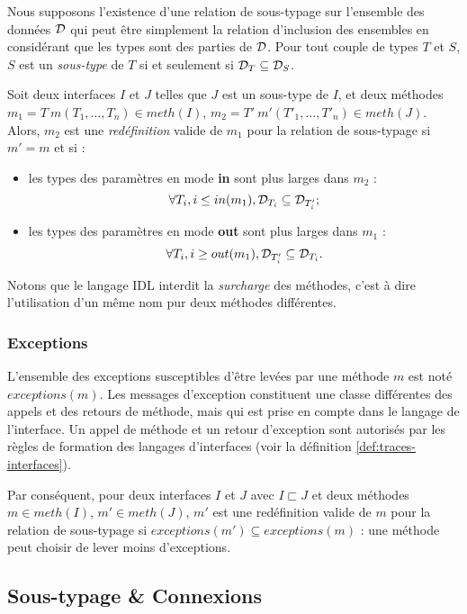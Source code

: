 Nous supposons l'existence d'une relation de sous-typage sur
l'ensemble des donn\'ees ${\cal D}$ qui peut \^etre simplement la
relation d'inclusion des ensembles en consid\'erant que les types
sont des parties de ${\cal D}$. Pour tout couple de  types $T$ et $S$, $S$ est un
\emph{sous-type} de $T$ si et seulement si ${\cal D}_T\subseteq {\cal D}_S$. 

Soit deux interfaces $I$ et $J$ telles que $J$ est un sous-type de
$I$, et deux m\'ethodes $m_1=T\ m(T_1,\dots,
T_n) \in meth(I)$, $m_2=T'\ m'(T'_1,\dots, T'_n) \in
meth(J)$. Alors, $m_2$ est une
\emph{red\'efinition} valide de $m_1$ pour  la relation de
sous-typage si $m'=m$ et si :
\begin{itemize}
  \item les types des param\`etres en mode \textbf{in} sont plus
  \og larges \fg{} dans $m_2$ : 
$$
\forall T_i, i\leq in(m_1), {\cal D}_{T_i} \subseteq {\cal D}_{T'_i} ;
$$
\item les types des param\`etres en mode \textbf{out} sont plus
  \og larges \fg{} dans $m_1$ : 
$$
\forall T_i, i\geq out(m_1), {\cal D}_{T'_i} \subseteq {\cal D}_{T_i}.
$$

\end{itemize}
Notons que le langage \textsf{IDL} interdit la \emph{surcharge} des
m\'ethodes, c'est \`a dire l'utilisation d'un m\^eme nom pur deux
m\'ethodes diff\'erentes.

\subsubsection{Exceptions}

L'ensemble des exceptions susceptibles d'\^etre lev\'ees par une
m\'ethode $m$ est not\'e $exceptions(m)$. Les messages d'exception
constituent une classe diff\'erentes des appels et des retours de
m\'ethode, mais qui est prise en compte dans le langage de
l'interface. Un appel de m\'ethode et un retour d'exception sont
autoris\'es par les r\`egles de formation des langages d'interfaces
(voir la d\'efinition \ref{def:traces-interfaces}). 

Par cons\'equent, pour deux interfaces $I$ et $J$ avec $I\sqsubset J$
et deux m\'ethodes $m \in meth(I)$, $m'\in meth(J)$, $m'$ est une
red\'efinition valide de $m$ pour la relation de sous-typage si
$exceptions(m') \subseteq exceptions(m)$ : une m\'ethode peut choisir
de lever moins d'exceptions.

\subsection{Sous-typage \& Connexions}

